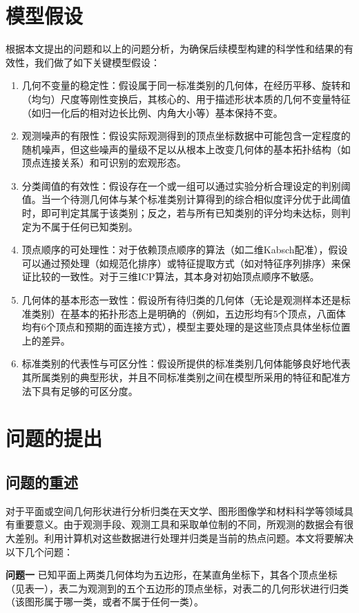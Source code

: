\section{模型假设}
根据本文提出的问题和以上的问题分析，为确保后续模型构建的科学性和结果的有效性，我们做了如下关键模型假设：
\begin{enumerate}
    \item 几何不变量的稳定性：假设属于同一标准类别的几何体，在经历平移、旋转和（均匀）尺度等刚性变换后，其核心的、用于描述形状本质的几何不变量特征（如归一化后的相对边长比例、内角大小等）基本保持不变。
    \item 观测噪声的有限性：假设实际观测得到的顶点坐标数据中可能包含一定程度的随机噪声，但这些噪声的量级不足以从根本上改变几何体的基本拓扑结构（如顶点连接关系）和可识别的宏观形态。
    \item 分类阈值的有效性：假设存在一个或一组可以通过实验分析合理设定的判别阈值。当一个待测几何体与某个标准类别计算得到的综合相似度评分优于此阈值时，即可判定其属于该类别；反之，若与所有已知类别的评分均未达标，则判定为不属于任何已知类别。
    \item 顶点顺序的可处理性：对于依赖顶点顺序的算法（如二维Kabsch配准），假设可以通过预处理（如规范化排序）或特征提取方式（如对特征序列排序）来保证比较的一致性。对于三维ICP算法，其本身对初始顶点顺序不敏感。
    \item 几何体的基本形态一致性：假设所有待归类的几何体（无论是观测样本还是标准类别）在基本的拓扑形态上是明确的（例如，五边形均有5个顶点，八面体均有6个顶点和预期的面连接方式），模型主要处理的是这些顶点具体坐标位置上的差异。
    \item 标准类别的代表性与可区分性：假设所提供的标准类别几何体能够良好地代表其所属类别的典型形状，并且不同标准类别之间在模型所采用的特征和配准方法下具有足够的可区分度。
\end{enumerate}

\section{问题的提出}
\subsection{问题的重述}
对于平面或空间几何形状进行分析归类在天文学、图形图像学和材料科学等领域具有重要意义。由于观测手段、观测工具和采取单位制的不同，所观测的数据会有很大差别。利用计算机对这些数据进行处理并归类是当前的热点问题。本文将要解决以下几个问题：

\textbf{问题一} 已知平面上两类几何体均为五边形，在某直角坐标下，其各个顶点坐标（见表一），表二为观测到的五个五边形的顶点坐标，对表二的几何形状进行归类（该图形属于哪一类，或者不属于任何一类）。


